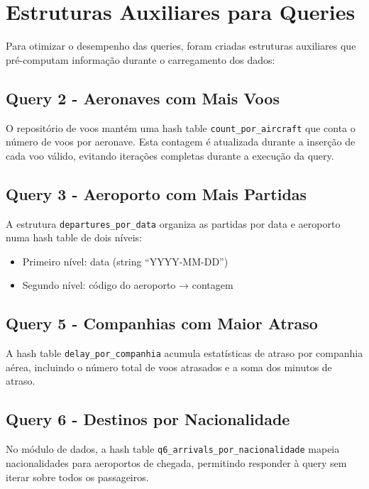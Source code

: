 \documentclass[a4paper,12pt]{scrreprt}
\begin{document}
\section{Estruturas Auxiliares para Queries}

Para otimizar o desempenho das queries, foram criadas estruturas auxiliares que pré-computam informação durante o carregamento dos dados:

\subsection{Query 2 - Aeronaves com Mais Voos}

O repositório de voos mantém uma hash table \texttt{count\_por\_aircraft} que conta o número de voos por aeronave. Esta contagem é atualizada durante a inserção de cada voo válido, evitando iterações completas durante a execução da query.

\subsection{Query 3 - Aeroporto com Mais Partidas}

A estrutura \texttt{departures\_por\_data} organiza as partidas por data e aeroporto numa hash table de dois níveis:
\begin{itemize}
    \item Primeiro nível: data (string ``YYYY-MM-DD'')
    \item Segundo nível: código do aeroporto → contagem
\end{itemize}

\subsection{Query 5 - Companhias com Maior Atraso}

A hash table \texttt{delay\_por\_companhia} acumula estatísticas de atraso por companhia aérea, incluindo o número total de voos atrasados e a soma dos minutos de atraso.

\subsection{Query 6 - Destinos por Nacionalidade}

No módulo de dados, a hash table \texttt{q6\_arrivals\_por\_nacionalidade} mapeia nacionalidades para aeroportos de chegada, permitindo responder à query sem iterar sobre todos os passageiros.
\end{document}
